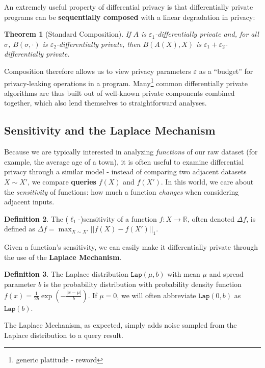 \documentclass[12pt]{article}
\newcommand{\RR}{\mathbb{R}}
\newcommand{\Lap}{\texttt{Lap}}
\newtheorem{thm}{Theorem}[section]
\theoremstyle{definition}
\newtheorem{defn}[thm]{Definition}
\begin{document}
An extremely useful property of differential privacy is that differentially private programs can be \textbf{sequentially composed} with a linear degradation in privacy:

\begin{thm}[Standard Composition]
    If $A$ is $\varepsilon_1$-differentially private and, for all $\sigma$, $B(\sigma, \cdot)$ is $\varepsilon_2$-differentially private, then $B(A(X), X)$ is $\varepsilon_1+\varepsilon_2$-differentially private. 
\end{thm}

Composition therefore allows us to view privacy parameters $\varepsilon$ as a ``budget'' for privacy-leaking operations in a program. Many\footnote{generic platitude - reword} common differentially private algorithms are thus built out of well-known private components combined together, which also lend themselves to straightforward analyses. 

\subsection{Sensitivity and the Laplace Mechanism}

Because we are typically interested in analyzing \textit{functions} of our raw dataset (for example, the average age of a town), it is often useful to examine differential privacy through a similar model - instead of comparing two adjacent datasets $X\sim X'$, we compare \textbf{queries} $f(X)$ and $f(X')$. In this world, we care about the \textit{sensitivity} of functions: how much a function \textit{changes} when considering adjacent inputs.  

\begin{defn}
    The ($\ell_1$-)sensitivity of a function $f: X\to \RR$, often denoted $\Delta f$, is defined as $\Delta f = \max_{X\sim X'}||f(X)-f(X')||_1$.
\end{defn}

Given a function's sensitivity, we can easily make it differentially private through the use of the \textbf{Laplace Mechanism}.

\begin{defn}
    The Laplace distribution $\Lap(\mu, b)$ with mean $\mu$ and spread parameter $b$ is the probability distribution with probability density function $f(x) = \frac{1}{2b}\exp(-\frac{|x-\mu|}{b})$. If $\mu =0$, we will often abbreviate $\Lap(0, b)$ as $\Lap(b)$. 
\end{defn}

The Laplace Mechanism, as expected, simply adds noise sampled from the Laplace distribution to a query result. 
\end{document}
